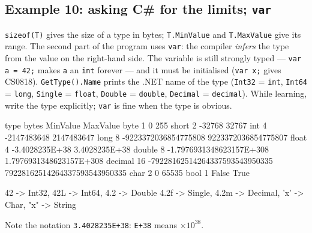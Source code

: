 \subsection{Example 10: asking C\# for the limits; \texttt{var}}
\texttt{sizeof(T)} gives the size of a type in bytes; \texttt{T.MinValue} and \texttt{T.MaxValue} give its range. The second part of the program uses \texttt{var}: the compiler \emph{infers} the type from the value on the right-hand side. The variable is still strongly typed --- \texttt{var a = 42;} makes \texttt{a} an \texttt{int} forever --- and it must be initialised (\texttt{var x;} gives CS0818). \texttt{GetType().Name} prints the .NET name of the type (\texttt{Int32} = \texttt{int}, \texttt{Int64} = \texttt{long}, \texttt{Single} = \texttt{float}, \texttt{Double} = \texttt{double}, \texttt{Decimal} = \texttt{decimal}). While learning, write the type explicitly; \texttt{var} is fine when the type is obvious.

\begin{consolebox}[Output]
\begin{run}
type     bytes  MinValue                        MaxValue
byte         1  0                               255
short        2  -32768                          32767
int          4  -2147483648                     2147483647
long         8  -9223372036854775808            9223372036854775807
float        4  -3.4028235E+38                  3.4028235E+38
double       8  -1.7976931348623157E+308        1.7976931348623157E+308
decimal     16  -79228162514264337593543950335  79228162514264337593543950335
char         2  0                               65535
bool         1  False                           True

42 -> Int32, 42L -> Int64, 4.2 -> Double
4.2f -> Single, 4.2m -> Decimal, 'x' -> Char, "x" -> String
\end{run}
\end{consolebox}
Note the notation \texttt{3.4028235E+38}: \texttt{E+38} means $\times 10^{38}$.

